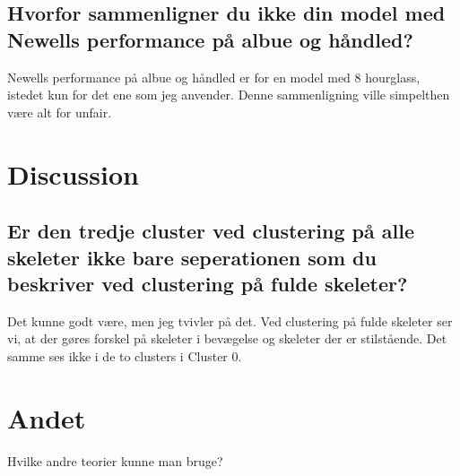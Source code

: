 \documentclass[a4paper]{article}
\begin{document}
\subsection{Hvorfor sammenligner du ikke din model med Newells performance på albue og håndled?}
Newells performance på albue og håndled er for en model med $8$ hourglass, istedet kun for det ene som jeg anvender. Denne sammenligning ville simpelthen være alt for unfair.

\section{Discussion}
\subsection{Er den tredje cluster ved clustering på alle skeleter ikke bare seperationen som du beskriver ved clustering på fulde skeleter?}
Det kunne godt være, men jeg tvivler på det. Ved clustering på fulde skeleter ser vi, at der gøres forskel på skeleter i bevægelse og skeleter der er stilstående. Det samme ses ikke i de to clusters i Cluster 0.

\section{Andet}
Hvilke andre teorier kunne man bruge?
\end{document}
